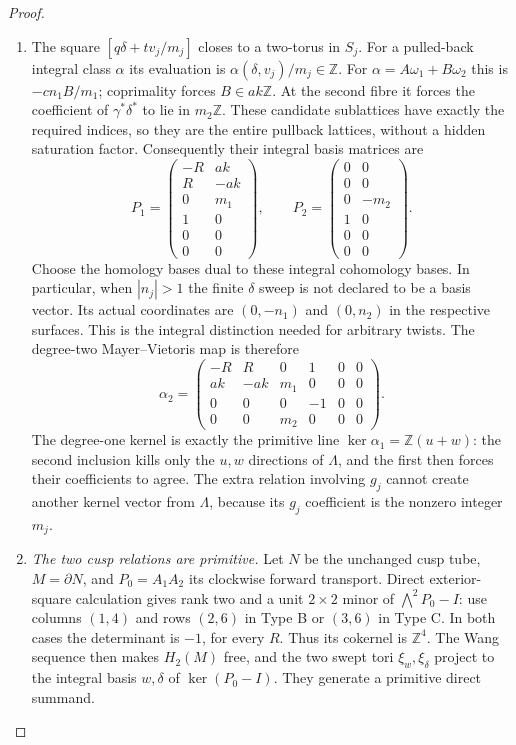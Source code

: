 \begin{proof}
\begin{enumerate}[label=\arabic*.,leftmargin=*]
\item The square $[q\delta+t v_j/m_j]$ closes to a two-torus in $S_j$.
For a pulled-back integral class $\alpha$ its evaluation is
$\alpha(\delta,v_j)/m_j\in\mathbb Z$.
For $\alpha=A\omega_1+B\omega_2$ this is
$-cn_1B/m_1$; coprimality forces $B\in ak\mathbb Z$.
At the second fibre it forces the coefficient of
$\gamma^*\delta^*$ to lie in $m_2\mathbb Z$.
These candidate sublattices have exactly the required indices,
so they are the entire pullback lattices, without a hidden
saturation factor. Consequently their integral basis matrices are
\[
 P_1=\begin{pmatrix}
 -R&ak\\R&-ak\\0&m_1\\1&0\\0&0\\0&0
 \end{pmatrix},\qquad
 P_2=\begin{pmatrix}
 0&0\\0&0\\0&-m_2\\1&0\\0&0\\0&0
 \end{pmatrix}.
\]
Choose the homology bases dual to these integral cohomology
bases. In particular, when $|n_j|>1$ the finite $\delta$ sweep is
not declared to be a basis vector. Its actual coordinates are
$(0,-n_1)$ and $(0,n_2)$ in the respective surfaces. This is the
integral distinction needed for arbitrary twists.
The degree-two Mayer--Vietoris map is therefore
\[
 \alpha_2=\begin{pmatrix}
 -R&R&0&1&0&0\\ak&-ak&m_1&0&0&0\\
 0&0&0&-1&0&0\\0&0&m_2&0&0&0
 \end{pmatrix}.
\]
The degree-one kernel is exactly the primitive line
$\ker\alpha_1=\mathbb Z(u+w)$: the second inclusion kills only
the $u,w$ directions of $\Lambda$, and the first then forces their
coefficients to agree. The extra relation involving $g_j$ cannot
create another kernel vector from $\Lambda$, because its
$g_j$ coefficient is the nonzero integer $m_j$.

\item \emph{The two cusp relations are primitive.}
Let $N$ be the unchanged cusp tube, $M=\partial N$, and
$P_0=A_1A_2$ its clockwise forward transport.
Direct exterior-square calculation gives rank two and a unit
$2\times2$ minor of $\bigwedge^2P_0-I$: use columns $(1,4)$
and rows $(2,6)$ in Type B or $(3,6)$ in Type C.
In both cases the determinant is $-1$, for every $R$.
Thus its cokernel is $\mathbb Z^4$. The Wang sequence then makes
$H_2(M)$ free, and the two swept tori $\xi_w,\xi_\delta$ project
to the integral basis $w,\delta$ of $\ker(P_0-I)$.
They generate a primitive direct summand.


\end{enumerate}
\end{proof}
